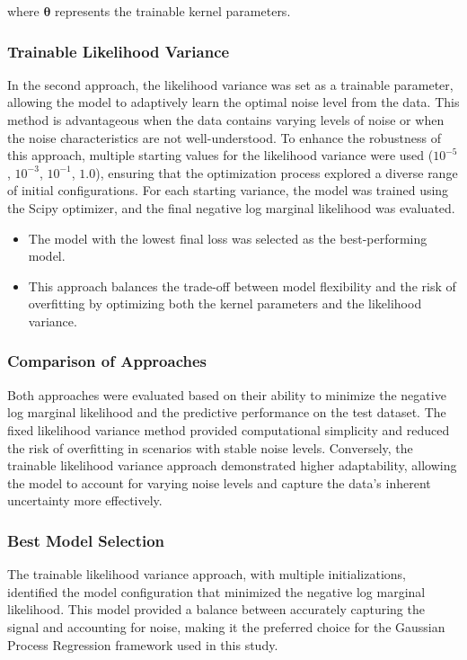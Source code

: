where $\boldsymbol{\theta}$ represents the trainable kernel parameters.

\subsubsection{Trainable Likelihood Variance}

In the second approach, the likelihood variance was set as a trainable parameter, allowing the model to adaptively learn the optimal noise level from the data. This method is advantageous when the data contains varying levels of noise or when the noise characteristics are not well-understood. To enhance the robustness of this approach, multiple starting values for the likelihood variance were used ($10^{-5}$, $10^{-3}$, $10^{-1}$, $1.0$), ensuring that the optimization process explored a diverse range of initial configurations. For each starting variance, the model was trained using the Scipy optimizer, and the final negative log marginal likelihood was evaluated.

\begin{itemize}
    \item The model with the lowest final loss was selected as the best-performing model.
    \item This approach balances the trade-off between model flexibility and the risk of overfitting by optimizing both the kernel parameters and the likelihood variance.
\end{itemize}

\subsubsection{Comparison of Approaches}

Both approaches were evaluated based on their ability to minimize the negative log marginal likelihood and the predictive performance on the test dataset. The fixed likelihood variance method provided computational simplicity and reduced the risk of overfitting in scenarios with stable noise levels. Conversely, the trainable likelihood variance approach demonstrated higher adaptability, allowing the model to account for varying noise levels and capture the data's inherent uncertainty more effectively.

\subsubsection{Best Model Selection}

The trainable likelihood variance approach, with multiple initializations, identified the model configuration that minimized the negative log marginal likelihood. This model provided a balance between accurately capturing the signal and accounting for noise, making it the preferred choice for the Gaussian Process Regression framework used in this study.


